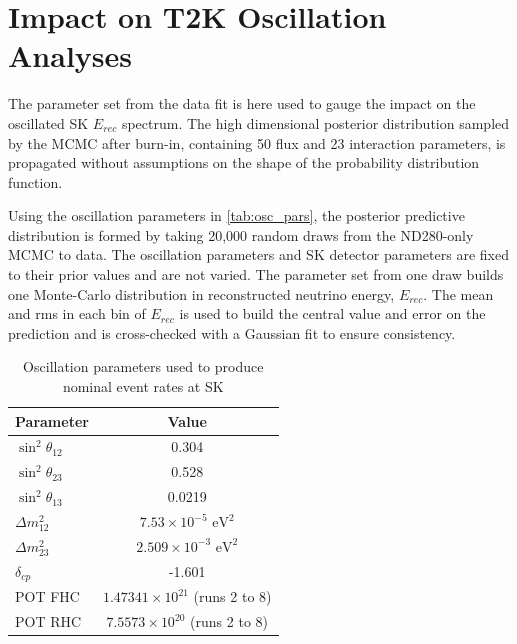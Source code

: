 \section{Impact on T2K Oscillation Analyses}
The parameter set from the data fit is here used to gauge the impact on the oscillated SK $E_{rec}$ spectrum. The high dimensional posterior distribution sampled by the MCMC after burn-in, containing 50 flux and 23 interaction parameters, is propagated without assumptions on the shape of the probability distribution function.

Using the oscillation parameters in \autoref{tab:osc_pars}, the posterior predictive distribution is formed by taking 20,000 random draws from the ND280-only MCMC to data. The oscillation parameters and SK detector parameters are fixed to their prior values and are not varied. The parameter set from one draw builds one Monte-Carlo distribution in reconstructed neutrino energy, $E_{rec}$. The mean and rms in each bin of $E_{rec}$ is used to build the central value and error on the prediction and is cross-checked with a Gaussian fit to ensure consistency.
\begin{table}[h]
	\begin{tabular}{l | c}
		\hline
		\hline
		Parameter & Value \\
		\hline
		$\sin^2\theta_{12}$ & 0.304 \\
		$\sin^2\theta_{23}$ & 0.528 \\
		$\sin^2\theta_{13}$ & 0.0219 \\
		$\Delta m^2_{12}$  & $7.53\times10^{-5} \text{ eV}^2$ \\
		$\Delta m^2_{23}$  & $2.509\times10^{-3} \text{ eV}^2$ \\
		$\delta_{cp}$ & -1.601 \\
		\hline
		POT FHC & $1.47341\times10^{21}$ (runs 2 to 8)\\ 
		POT RHC & $7.5573\times10^{20}$ (runs 2 to 8)\\
		\hline
		\hline
	\end{tabular}
\caption{Oscillation parameters used to produce nominal event rates at SK}
\label{tab:osc_pars}
\end{table}

